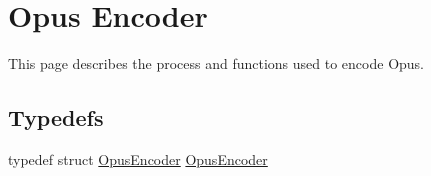 \hypertarget{group__opus__encoder}{}\section{Opus Encoder}
\label{group__opus__encoder}


This page describes the process and functions used to encode Opus.  


\subsection*{Typedefs}
\begin{DoxyCompactItemize}
\item 
typedef struct \mbox{\hyperlink{group__opus__encoder_gaf461a3ef2f10c2fe8b994a176f06c9bd}{Opus\+Encoder}} \mbox{\hyperlink{group__opus__encoder_gaf461a3ef2f10c2fe8b994a176f06c9bd}{Opus\+Encoder}}
\end{DoxyCompactItemize}
